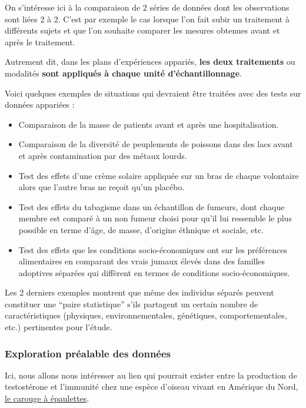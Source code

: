 \documentclass[
  a4paper,
]{article}
\providecommand{\tightlist}{%
  \setlength{\itemsep}{0pt}\setlength{\parskip}{0pt}}
\begin{document}
On s'intéresse ici à la comparaison de 2 séries de données dont les observations sont liées 2 à 2. C'est par exemple le cas lorsque l'on fait subir un traitement à différents sujets et que l'on souhaite comparer les mesures obtenues avant et après le traitement.

Autrement dit, dans les plans d'expériences appariés, \textbf{les deux traitements} ou modalités \textbf{sont appliqués à chaque unité d'échantillonnage}.

Voici quelques exemples de situations qui devraient être traitées avec des tests sur données appariées :

\begin{itemize}
\tightlist
\item
  Comparaison de la masse de patients avant et après une hospitalisation.
\item
  Comparaison de la diversité de peuplements de poissons dans des lacs avant et après contamination par des métaux lourds.
\item
  Test des effets d'une crème solaire appliquée sur un bras de chaque volontaire alors que l'autre bras ne reçoit qu'un placébo.
\item
  Test des effets du tabagisme dans un échantillon de fumeurs, dont chaque membre est comparé à un non fumeur choisi pour qu'il lui ressemble le plus possible en terme d'âge, de masse, d'origine éthnique et sociale, etc.
\item
  Test des effets que les conditions socio-économiques ont sur les préférences alimentaires en comparant des vrais jumaux élevés dans des familles adoptives séparées qui diffèrent en termes de conditions socio-économiques.
\end{itemize}

Les 2 derniers exemples montrent que même des individus séparés peuvent constituer une ``paire statistique'' s'ils partagent un certain nombre de caractéristiques (physiques, environnementales, génétiques, comportementales, etc.) pertinentes pour l'étude.

\hypertarget{Explo2}{%
\subsubsection{Exploration préalable des données}\label{Explo2}}

Ici, nous allons nous intéresser au lien qui pourrait exister entre la production de testostérone et l'immunité chez une espèce d'oiseau vivant en Amérique du Nord, \href{https://fr.wikipedia.org/wiki/Carouge_à_épaulettes}{le carouge à épaulettes}.
\end{document}
